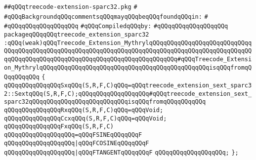 \label{src/lib/compiler/back/low/main/sparc32/treecode-extension-sparc32.pkg}
\verb|##qQQqtreecode-extension-sparc32.pkg|\newline
\verb|#|\newline
\verb|#qQQqBackgroundqQQqcommentsqQQqmayqQQqbeqQQqfoundqQQqin:|\newline
\verb|#|\newline
\verb|#qQQqqQQqqQQqqQQqqQQq|\newline
\newline
\verb|#qQQqCompiledqQQqby:|\newline
\verb|#qQQqqQQqqQQqqQQqqQQq|\newline
\newline
\verb|packageqQQqqQQqtreecode_extension_sparc32|\newline
\verb|:qQQq(weak)qQQqTreecode_Extension_MythrylqQQqqQQqqQQqqQQqqQQqqQQqqQQqqQQqqQQqqQQqqQQqqQQqqQQqqQQqqQQqqQQqqQQqqQQqqQQqqQQqqQQqqQQqqQQqqQQqqQQqqQQqqQQqqQQqqQQqqQQqqQQqqQQqqQQqqQQqqQQqqQQqqQQq#qQQqTreecode_Extension_MythrylqQQqqQQqqQQqqQQqqQQqqQQqqQQqqQQqqQQqqQQqqQQqqQQqisqQQqfromqQQqqQQqqQQq|\newline
\verb|{|\newline
\verb|qQQqqQQqqQQqqQQqSxqQQq(S,R,F,C)qQQq=qQQqtreecode_extension_sext_sparc32::SextqQQq(S,R,F,C);qQQqqQQqqQQqqQQqqQQq#qQQqtreecode_extension_sext_sparc32qQQqqQQqqQQqqQQqqQQqqQQqqQQqisqQQqfromqQQqqQQqqQQq|\newline
\verb|qQQqqQQqqQQqqQQqRxqQQq(S,R,F,C)qQQq=qQQqVoid;|\newline
\verb|qQQqqQQqqQQqqQQqCcxqQQq(S,R,F,C)qQQq=qQQqVoid;|\newline
\newline
\verb|qQQqqQQqqQQqqQQqFxqQQq(S,R,F,C)|\newline
\verb|qQQqqQQqqQQqqQQqqQQq=qQQqFSINEqQQqqQQqF|\newline
\verb|qQQqqQQqqQQqqQQqqQQq|\verb#|qQQqFCOSINEqQQqqQQqF#\newline
\verb|qQQqqQQqqQQqqQQqqQQq|\verb#|qQQqFTANGENTqQQqqQQqF#\newline
\verb|qQQqqQQqqQQqqQQqqQQq;|\newline
\verb|};|\newline
\newline

